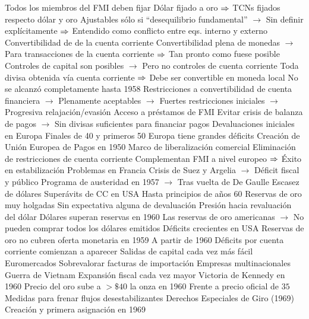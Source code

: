 \documentclass{nuevotema}
\begin{document}
\begin{esquemal}
				\4[] Todos los miembros del FMI deben fijar
				\4[] Dólar fijado a oro
				\4[] $\then$ TCNs fijados respecto dólar y oro
				\4[] Ajustables sólo si ``desequilibrio fundamental''
				\4[] $\to$ Sin definir explícitamente
				\4[] $\then$ Entendido como conflicto entre eqs. interno y externo
				\4[II] Convertibilidad de de la cuenta corriente
				\4[] Convertibilidad plena de monedas
				\4[] $\to$ Para transacciones de la cuenta corriente
				\4[] $\then$ Tan pronto como fuese posible
				\4[] Controles de capital son posibles
				\4[] $\to$ Pero no controles de cuenta corriente
				\4[] Toda divisa obtenida vía cuenta corriente
				\4[] $\then$ Debe ser convertible en moneda local
				\4[] No se alcanzó completamente hasta 1958
				\4[] Restricciones a convertibilidad de cuenta financiera
				\4[] $\to$ Plenamente aceptables
				\4[] $\to$ Fuertes restricciones iniciales
				\4[] $\to$ Progresiva relajación/evasión
				\4[III] Acceso a préstamos de FMI
				\4[] Evitar crisis de balanza de pagos
				\4[] $\to$ Sin divisas suficientes para financiar pagos
			\3 Devaluaciones iniciales en Europa
				\4 Finales de 40 y primeros 50
				\4 Europa tiene grandes déficits
				\4 Creación de Unión Europea de Pagos en 1950
				\4[] Marco de liberalización comercial
				\4[] Eliminación de restricciones de cuenta corriente
				\4[] Complementan FMI a nivel europeo
				\4[] $\then$ Éxito en estabilización
				\4 Problemas en Francia
				\4[] Crisis de Suez y Argelia
				\4[] $\to$ Déficit fiscal y público
				\4[] Programa de austeridad en 1957
				\4[] $\to$ Tras vuelta de De Gaulle
			\3 Escasez de dólares
				\4 Superávits de CC en USA
				\4 Hasta principios de años 60
				\4 Reservas de oro muy holgadas
				\4[] Sin expectativa alguna de devaluación
				\4[$\then$] Presión hacia revaluación del dólar
				\4 Dólares superan reservas en 1960
				\4[] Las reservas de oro americanas
				\4[] $\to$ No pueden comprar todos los dólares emitidos
			\3 Déficits crecientes en USA
				\4 Reservas de oro no cubren oferta monetaria en 1959
				\4 A partir de 1960
				\4 Déficits por cuenta corriente comienzan a aparecer
				\4 Salidas de capital cada vez más fácil
				\4[] Euromercados
				\4[] Sobrevalorar facturas de importación
				\4[] Empresas multinacionales
				\4 Guerra de Vietnam
				\4[] Expansión fiscal cada vez mayor
				\4 Victoria de Kennedy en 1960
				\4[] Precio del oro sube a $>\$40$ la onza en 1960
				\4[] Frente a precio oficial de $35$
			\3 Medidas para frenar flujos desestabilizantes
				\4 Derechos Especiales de Giro (1969)
				\4[] Creación y primera asignación en 1969

\end{esquemal}
\end{document}
